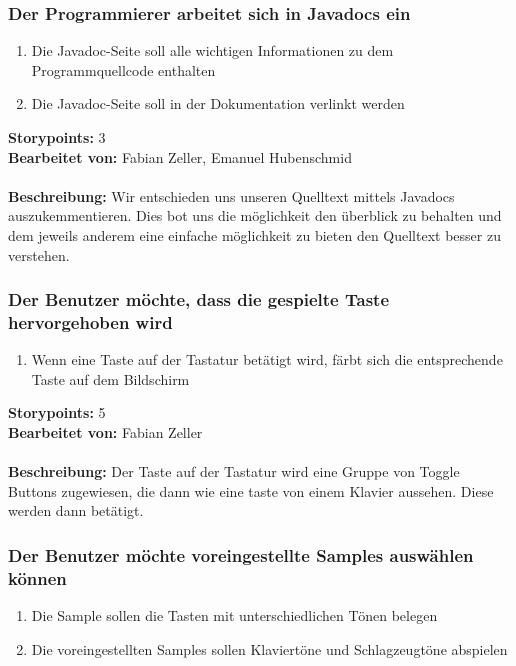 \subsubsection{Der Programmierer arbeitet sich in Javadocs ein}

\begin{enumerate}
 \item Die Javadoc-Seite soll alle wichtigen Informationen zu dem Programmquellcode enthalten
 \item Die Javadoc-Seite soll in der Dokumentation verlinkt werden
\end{enumerate}

\textbf{Storypoints:} 3 \\
\textbf{Bearbeitet von:} Fabian Zeller, Emanuel Hubenschmid \\
\\
\textbf{Beschreibung:} Wir entschieden uns unseren Quelltext mittels Javadocs auszukemmentieren. 
Dies bot uns die möglichkeit den überblick zu behalten und dem jeweils anderem eine einfache 
möglichkeit zu bieten den Quelltext besser zu verstehen.


\subsubsection{Der Benutzer möchte, dass die gespielte Taste hervorgehoben wird}

\begin{enumerate}
 \item Wenn eine Taste auf der Tastatur betätigt wird, färbt sich die entsprechende Taste auf dem 
Bildschirm
\end{enumerate}

\textbf{Storypoints:} 5 \\
\textbf{Bearbeitet von:} Fabian Zeller \\
\\
\textbf{Beschreibung:} Der Taste auf der Tastatur wird eine Gruppe von Toggle Buttons zugewiesen, die dann wie eine taste von einem Klavier aussehen. Diese werden dann betätigt.


\subsubsection{Der Benutzer möchte voreingestellte Samples auswählen können}

\begin{enumerate}
 \item Die Sample sollen die Tasten mit unterschiedlichen Tönen belegen
 \item Die voreingestellten Samples sollen Klaviertöne und Schlagzeugtöne 
abspielen
\end{enumerate}

